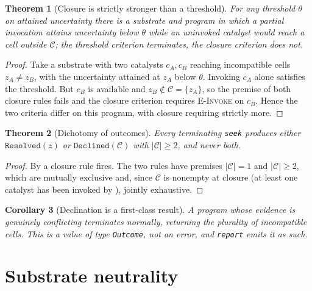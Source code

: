 \documentclass[11pt,a4paper]{article}
\theoremstyle{thmstyle}
\newtheorem{theorem}{Theorem}[section]
\newtheorem{corollary}[theorem]{Corollary}
\theoremstyle{definition}
\theoremstyle{remark}
\newcommand{\abs}[1]{\lvert#1\rvert}
\begin{document}
\begin{theorem}[Closure is strictly stronger than a threshold]
\label{thm:closure-stronger}
For any threshold $\theta$ on attained uncertainty there is a substrate and
program in which a partial invocation attains uncertainty below $\theta$
while an uninvoked catalyst would reach a cell outside $\mathcal{C}$; the
threshold criterion terminates, the closure criterion does not.
\end{theorem}

\begin{proof}
Take a substrate with two catalysts $c_A,c_B$ reaching incompatible cells
$z_A\ne z_B$, with the uncertainty attained at $z_A$ below $\theta$.
Invoking $c_A$ alone satisfies the threshold. But $c_B$ is available and
$z_B\notin\mathcal{C}=\{z_A\}$, so the premise of both closure rules fails
and the closure criterion requires \textsc{E-Invoke} on $c_B$. Hence the two
criteria differ on this program, with closure requiring strictly more.
\end{proof}

\begin{theorem}[Dichotomy of outcomes]
\label{thm:dichotomy}
Every terminating \texttt{seek} produces either
$\texttt{Resolved}(z)$ or $\texttt{Declined}(\mathcal{C})$ with
$\abs{\mathcal{C}}\ge2$, and never both.
\end{theorem}

\begin{proof}
By  a closure rule fires. The two rules have premises
$\abs{\mathcal{C}}=1$ and $\abs{\mathcal{C}}\ge2$, which are mutually
exclusive and, since $\mathcal{C}$ is nonempty at closure (at least one
catalyst has been invoked by ), jointly exhaustive.
\end{proof}

\begin{corollary}[Declination is a first-class result]
\label{cor:decline}
A program whose evidence is genuinely conflicting terminates normally,
returning the plurality of incompatible cells. This is a value of type
\texttt{Outcome}, not an error, and \texttt{report} emits it as such.
\end{corollary}

\section{Substrate neutrality}
\label{sec:neutrality}
\end{document}
